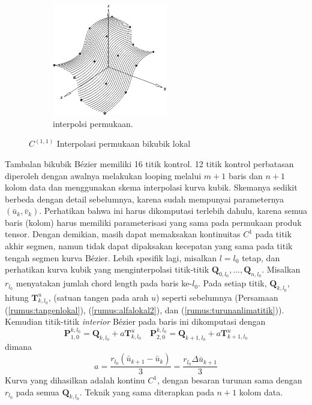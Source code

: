 \begin{figure}[H]
\begin{subfigure}{.5\textwidth}
		\centering
		\includegraphics[keepaspectratio, width=5cm]{gambar/Interpolasi/pic14.png}
		\caption{interpolsi permukaan.}
		\label{gambar:surfaceinterpolant}
	\end{subfigure}
	\caption{$C^{(1,1)}$ Interpolasi permukaan bikubik lokal}
\end{figure}

Tambalan bikubik Bézier memiliki 16 titik kontrol. 
12 titik kontrol perbatasan diperoleh dengan awalnya 
melakukan looping melalui $m + 1$ baris dan $n + 1$ 
kolom data dan menggunakan skema interpolasi kurva 
kubik. Skemanya sedikit berbeda dengan detail 
sebelumnya, karena sudah mempunyai parameternya 
{$(\bar{u}_k, \bar{v}_k)$}. Perhatikan bahwa ini harus 
dikomputasi terlebih dahulu, karena semua baris (kolom) 
harus memiliki parameterisasi yang sama pada permukaan 
produk tensor. Dengan demikian, masih dapat 
memaksakan kontinuitas $C^1$ pada titik akhir segmen, 
namun tidak dapat dipaksakan kecepatan yang 
sama pada titik tengah segmen kurva Bézier. Lebih 
spesifik lagi, misalkan $l = l_0$ tetap, dan perhatikan 
kurva kubik yang menginterpolasi titik-titik $\textbf{Q}_{0,l_0} 
, ..., \textbf{Q}_{n,l_0}$. Misalkan $r_{l_0}$ menyatakan 
jumlah chord length pada baris ke-$l_0$. Pada setiap titik, 
$\textbf{Q}_{k,l_0}$, hitung $\textbf{T}_{k,l_0}^u$, 
(satuan tangen pada arah $u$) seperti sebelumnya 
(Persamaan (\ref{rumus:tangenlokal}), (\ref{rumus:alfalokal2}), 
dan (\ref{rumus:turunanlimatitik})). Kemudian titik-titik 
\textit{interior} Bézier pada baris ini dikomputasi dengan
\begin{equation}
	\textbf{P}_{1,0}^{k,l_0}=\textbf{Q}_{k,l_0}+a\textbf{T}_{k,l_0}^u \quad
	\textbf{P}_{2,0}^{k,l_0}=\textbf{Q}_{k+1,l_0}+a\textbf{T}_{k+1,l_0}^u 	
\end{equation}
dimana \[a=\frac{r_{l_0}(\bar{u}_{k+1}-\bar{u}_k)}{3}=
\frac{r_{l_0}\Delta\bar{u}_{k+1}}{3}\]
Kurva yang dihasilkan adalah kontinu $C^1$, dengan 
besaran turunan sama dengan $r_{l_0}$ pada semua 
$\textbf{Q}_{k,l_0}$. Teknik yang sama diterapkan 
pada $n + 1$ kolom data.


